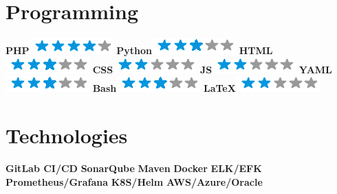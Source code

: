 \documentclass[]{friggeri-cv}
\begin{document}
\begin{aside}
  \section{Programming}
    \textbf{PHP}\includegraphics[scale=0.40]{img/4stars.png}
    \textbf{Python}\includegraphics[scale=0.40]{img/3stars.png}
    \textbf{HTML}\includegraphics[scale=0.40]{img/3stars.png}
    \textbf{CSS}\includegraphics[scale=0.40]{img/2stars.png}
    \textbf{JS}\includegraphics[scale=0.40]{img/2stars.png}
    \textbf{YAML}\includegraphics[scale=0.40]{img/3stars.png}
    \textbf{Bash}\includegraphics[scale=0.40]{img/3stars.png}
    \textbf{LaTeX}\includegraphics[scale=0.40]{img/2stars.png}
    ~
  \section{Technologies}
    \textbf{GitLab CI/CD}
    \textbf{SonarQube}
    \textbf{Maven}
    \textbf{Docker}
    \textbf{ELK/EFK}
    \textbf{Prometheus/Grafana}
    \textbf{K8S/Helm}
    \textbf{AWS/Azure/Oracle}
    ~
\end{aside}
~
\end{document}
